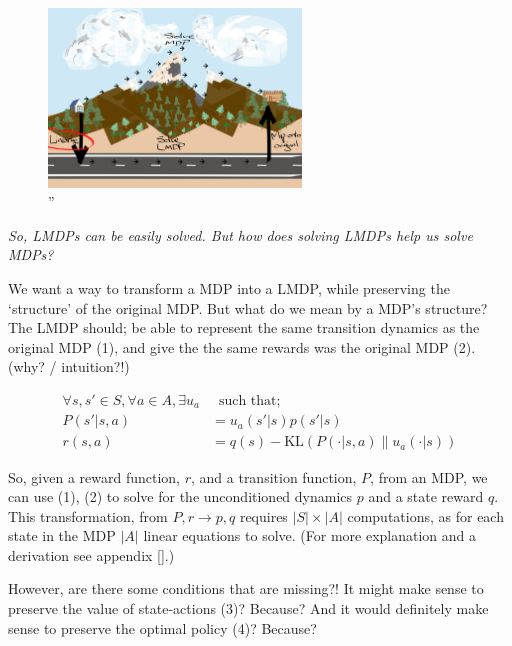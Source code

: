 \begin{figure}[h!]
\centering
\includegraphics[width=0.6\textwidth,height=0.3\textheight]{../../pictures/drawings/abstract-representations-linear.png}
\caption{''}
\end{figure}

\begin{displayquote}
\textit{So, LMDPs can be easily solved. But how does solving LMDPs help us solve MDPs?}
\end{displayquote}

We want a way to transform a MDP into a LMDP, while preserving the
`structure' of the original MDP. But what do we mean by a MDP's structure?
The LMDP should; be able to represent the same transition dynamics as the original MDP (1),
and give the the same rewards was the original MDP (2). \cite{Todorov} {\color{red}(why? / intuition?!)}

\begin{align*}
\forall s, s' \in S, \forall a \in A, \exists u_a& \;\;\text{such that;} \\
P(s' | s, a) &= u_a(s'|s)p(s'|s) \tag{1} \\
r(s, a) &= q(s) - \text{KL}(P(\cdot | s, a) \parallel u_a(\cdot| s) ) \tag{2}
\end{align*}


So, given a reward function, $r$, and a transition function, $P$,
from an MDP, we can use (1), (2) to solve for the unconditioned dynamics $p$ and a state reward $q$.
This transformation, from $P, r \to p, q$ requires $|S| \times |A|$ computations, as for each state in the
MDP \(|A|\) linear equations to solve. (For more explanation and a derivation see appendix [].)

However, are there some conditions that are missing?!
It might make sense to preserve the value of state-actions (3)? {\color{red}Because?}
And it would definitely make sense to preserve the optimal policy (4)? {\color{red}Because?}

